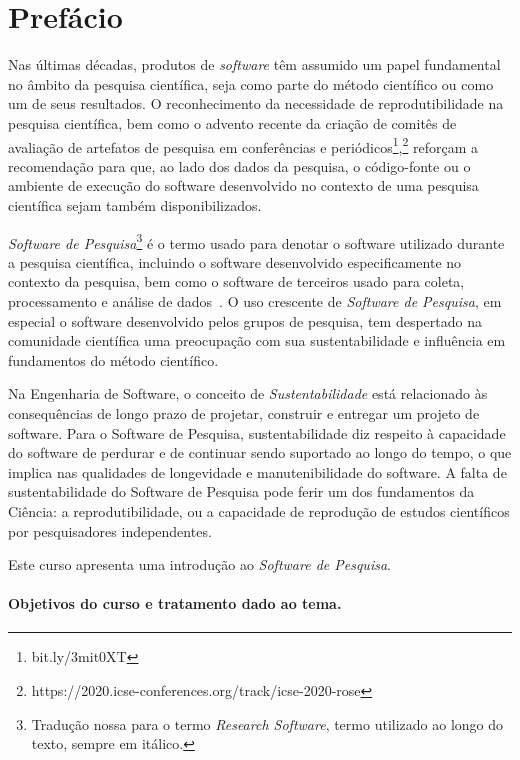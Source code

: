\section*{Prefácio}
\label{section:introduction}

Nas últimas décadas, produtos de \textit{software} têm assumido um papel fundamental no âmbito da pesquisa científica, seja como parte do método científico ou como um de seus resultados. 
%
O reconhecimento da necessidade de reprodutibilidade na pesquisa científica, bem como o advento recente da criação de comitês de avaliação de artefatos de pesquisa em conferências e periódicos\footnote{bit.ly/3mit0XT},\footnote{https://2020.icse-conferences.org/track/icse-2020-rose} reforçam a recomendação para que, ao lado dos dados da pesquisa, o código-fonte ou o ambiente de execução do software desenvolvido no contexto de uma pesquisa científica sejam também disponibilizados. 

\textit{Software de Pesquisa}\footnote{Tradução nossa para o termo \textit{Research Software}, termo utilizado ao longo do texto, sempre em itálico.} é o termo usado para denotar o software utilizado durante a pesquisa científica, incluindo o software desenvolvido especificamente no contexto da pesquisa, bem como o software de terceiros usado para coleta, processamento e análise de dados~\cite{allen_et_al:DM:2017:7146}.
%
O uso crescente de \textit{Software de Pesquisa}, em especial o software  desenvolvido pelos grupos de pesquisa, tem despertado na comunidade científica uma preocupação com sua sustentabilidade e influência em fundamentos do método científico.

Na Engenharia de Software, o conceito de \textit{Sustentabilidade} está relacionado às consequências de longo prazo de projetar, construir e entregar um projeto de software. 
%
Para o Software de Pesquisa, sustentabilidade diz respeito à capacidade do software de perdurar e de continuar sendo suportado ao longo do tempo, o que implica nas qualidades de longevidade e manutenibilidade do software. 
%
A falta de sustentabilidade do Software de Pesquisa pode ferir um dos fundamentos da Ciência: a reprodutibilidade, ou a capacidade de reprodução de estudos científicos por pesquisadores independentes. 

Este curso apresenta uma introdução ao \textit{Software de Pesquisa}.

\noindent\paragraph*{Objetivos do curso e tratamento dado ao tema.}

